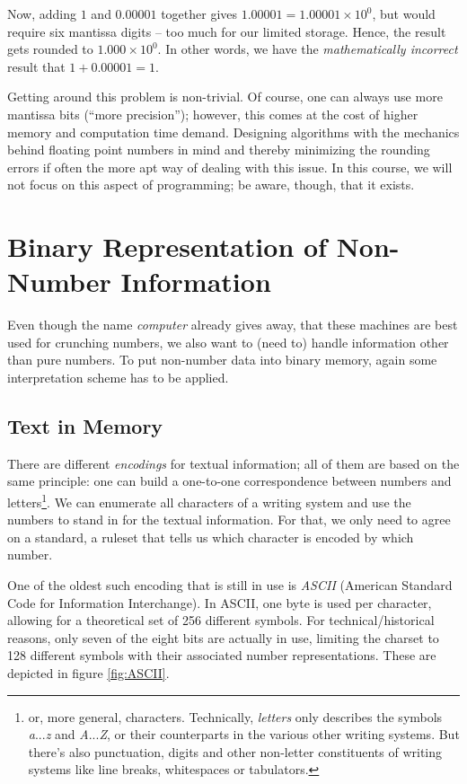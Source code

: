 %
\begin{plusbox}[]
Now, adding $1$ and $0.00001$ together gives $1.00001 = 1.00001 \times 10^{0}$, but would require six mantissa digits -- too much for our limited storage. Hence, the result gets rounded to $1.000 \times 10^{0}$. In other words, we have the \emph{mathematically incorrect} result that $1 + 0.00001 = 1$.

Getting around this problem is non-trivial. Of course, one can always use more mantissa bits (\enquote{more precision}); however, this comes at the cost of higher memory and computation time demand. Designing algorithms with the mechanics behind floating point numbers in mind and thereby minimizing the rounding errors if often the more apt way of dealing with this issue. In this course, we will not focus on this aspect of programming; be aware, though, that it exists.
\end{plusbox}

\section{Binary Representation of Non-Number Information}
Even though the name \emph{computer} already gives away, that these machines are best used for crunching numbers, we also want to (need to) handle information other than pure numbers. To put non-number data into binary memory, again some interpretation scheme has to be applied.

\subsection{Text in Memory}
There are different \emph{encodings} for textual information; all of them are based on the same principle: one can build a one-to-one correspondence between numbers and letters\footnote{or, more general, characters. Technically, \emph{letters} only describes the symbols \emph{a}...\emph{z} and \emph{A}...\emph{Z}, or their counterparts in the various other writing systems. But there's also punctuation, digits and other non-letter constituents of writing systems like line breaks, whitespaces or tabulators.}. We can enumerate all characters of a writing system and use the numbers to stand in for the textual information. For that, we only need to agree on a standard, \ie a ruleset that tells us which character is encoded by which number.

One of the oldest such encoding that is still in use is \emph{ASCII} (American Standard Code for Information Interchange). In ASCII, one byte is used per character, allowing for a theoretical set of 256 different symbols. For technical/historical reasons, only seven of the eight bits are actually in use, limiting the charset to 128 different symbols with their associated number representations. These are depicted in figure \ref{fig:ASCII}.

